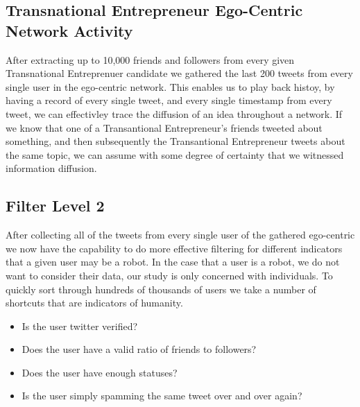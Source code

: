 \subsection{Transnational Entrepreneur Ego-Centric Network Activity}
After extracting up to 10,000 friends and followers from every given Transnational Entreprenuer candidate we gathered the last 200 tweets from every single user in the ego-centric network. This enables us to play back histoy, by having a record of every single tweet, and every single timestamp from every tweet, we can effectivley trace the diffusion of an idea throughout a network. If we know that one of a Transantional Entrepreneur's friends tweeted about something, and then subsequently the Transantional Entrepreneur tweets about the same topic, we can assume with some degree of certainty that we witnessed information diffusion.

\subsection{Filter Level 2}
After collecting all of the tweets from every single user of the gathered ego-centric we now have the capability to do more effective filtering for different indicators that a given user may be a robot. In the case that a user is a robot, we do not want to consider their data, our study is only concerned with individuals. To quickly sort through hundreds of thousands of users we take a number of shortcuts that are indicators of humanity.
\begin{itemize}
\item Is the user twitter verified?
\item Does the user have a valid ratio of friends to followers?
\item Does the user have enough statuses?
\item Is the user simply spamming the same tweet over and over again?
\end{itemize}

